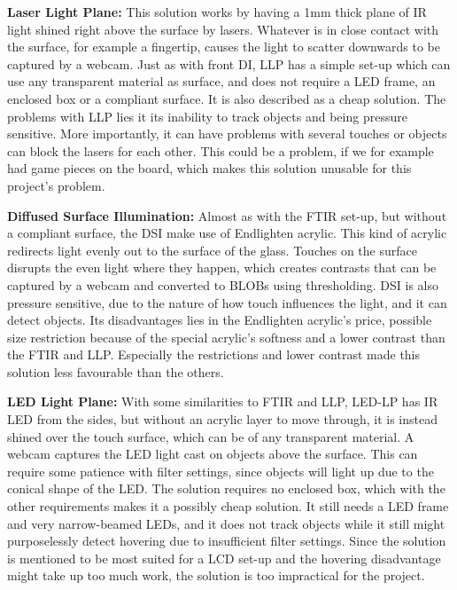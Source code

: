 \textbf{Laser Light Plane:} This solution works by having a 1mm thick plane of IR light shined right above the surface by lasers. Whatever is in close contact with the surface, for example a fingertip, causes the light to scatter downwards to be captured by a webcam. Just as with front DI, LLP has a simple set-up which can use any transparent material as surface, and does not require a LED frame, an enclosed box or a compliant surface. It is also described as a cheap solution. The problems with LLP lies it its inability to track objects and being pressure sensitive. More importantly, it can have problems with several touches or objects can block the lasers for each other. This could be a problem, if we for example had game pieces on the board, which makes this solution unusable for this project's problem. 
 
\textbf{Diffused Surface Illumination:} Almost as with the FTIR set-up, but without a compliant surface, the DSI make use of Endlighten acrylic. This kind of acrylic redirects light evenly out to the surface of the glass.  Touches on the surface disrupts the even light where they happen, which creates contrasts that can be captured by a webcam and converted to BLOBs using thresholding. DSI is also pressure sensitive, due to the nature of how touch influences the light, and it can detect objects. Its disadvantages lies in the Endlighten acrylic's price, possible size restriction because of the special acrylic's softness and a lower contrast than the FTIR and LLP. Especially the restrictions and lower contrast made this solution less favourable than the others.

\textbf{LED Light Plane:} With some similarities to FTIR and LLP, LED-LP has IR LED from the sides, but without an acrylic layer to move through, it is instead shined over the touch surface, which can be of any transparent material. A webcam captures the LED light cast on objects above the surface. This can require some patience with filter settings, since objects will light up due to the conical shape of the LED. The solution requires no enclosed box, which with the other requirements makes it a possibly cheap solution. It still needs a LED frame and very narrow-beamed LEDs, and it does not track objects while it still might purposelessly detect hovering due to insufficient filter settings. Since the solution is mentioned to be most suited for a LCD set-up and the hovering disadvantage might take up too much work, the solution is too impractical for the project.

